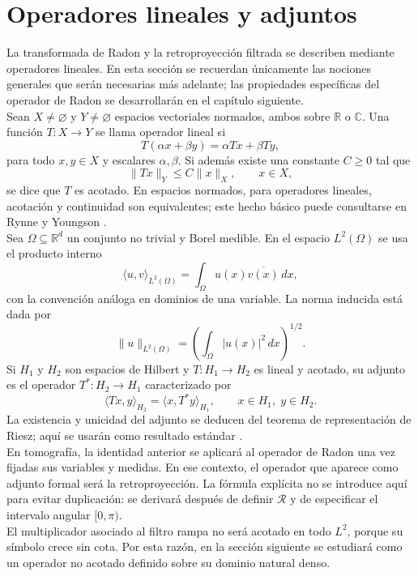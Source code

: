 \section{Operadores lineales y adjuntos}
\label{OperatorsAdjoints}

La transformada de Radon y la retroproyección filtrada se describen mediante operadores lineales. En esta sección se recuerdan únicamente las nociones generales que serán necesarias más adelante; las propiedades específicas del operador de Radon se desarrollarán en el capítulo siguiente.\\

Sean $X\neq\varnothing$ y $Y\neq\varnothing$ espacios vectoriales normados, ambos sobre $\mathbb{R}$ o $\mathbb{C}$. Una función $T:X\to Y$ se llama operador lineal si
\[
T(\alpha x+\beta y)=\alpha T x+\beta T y,
\]
para todo $x,y\in X$ y escalares $\alpha,\beta$. Si además existe una constante $C\geq 0$ tal que
\[
\|Tx\|_{Y}\leq C\|x\|_{X},
\qquad x\in X,
\]
se dice que $T$ es acotado. En espacios normados, para operadores lineales, acotación y continuidad son equivalentes; este hecho básico puede consultarse en Rynne y Youngson \cite[Sec.~4.1]{rynne_youngson2000}.\\

Sea $\Omega\subseteq\mathbb R^d$ un conjunto no trivial y Borel medible. En el espacio $L^{2}(\Omega)$ se usa el producto interno
\[
\langle u,v\rangle_{L^{2}(\Omega)}
=
\int_{\Omega} u(x)\overline{v(x)}\,dx,
\]
con la convención análoga en dominios de una variable. La norma inducida está dada por
\[
\|u\|_{L^2(\Omega)}
=
\left(\int_\Omega |u(x)|^2\,dx\right)^{1/2}.
\]
Si $H_{1}$ y $H_{2}$ son espacios de Hilbert y $T:H_{1}\to H_{2}$ es lineal y acotado, su adjunto es el operador $T^{*}:H_{2}\to H_{1}$ caracterizado por
\[
\langle Tx,y\rangle_{H_{2}}
=
\langle x,T^{*}y\rangle_{H_{1}},
\qquad x\in H_{1},\; y\in H_{2}.
\]
La existencia y unicidad del adjunto se deducen del teorema de representación de Riesz; aquí se usarán como resultado estándar \cite[Sec.~5.1]{rynne_youngson2000}.\\

En tomografía, la identidad anterior se aplicará al operador de Radon una vez fijadas sus variables y medidas. En ese contexto, el operador que aparece como adjunto formal será la retroproyección. La fórmula explícita no se introduce aquí para evitar duplicación: se derivará después de definir $\mathcal{R}$ y de especificar el intervalo angular $[0,\pi)$.\\

El multiplicador asociado al filtro rampa no será acotado en todo $L^{2}$, porque su símbolo crece sin cota. Por esta razón, en la sección siguiente se estudiará como un operador no acotado definido sobre su dominio natural denso.
